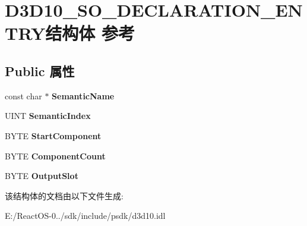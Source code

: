 \hypertarget{struct_d3_d10___s_o___d_e_c_l_a_r_a_t_i_o_n___e_n_t_r_y}{}\section{D3\+D10\+\_\+\+S\+O\+\_\+\+D\+E\+C\+L\+A\+R\+A\+T\+I\+O\+N\+\_\+\+E\+N\+T\+R\+Y结构体 参考}
\label{struct_d3_d10___s_o___d_e_c_l_a_r_a_t_i_o_n___e_n_t_r_y}
\subsection*{Public 属性}
\begin{DoxyCompactItemize}
\item 
\mbox{\label{struct_d3_d10___s_o___d_e_c_l_a_r_a_t_i_o_n___e_n_t_r_y_ad23d4ee16b552d085f5c798069dd0d74}} 
const char $\ast$ {\bfseries Semantic\+Name}
\item 
\mbox{\label{struct_d3_d10___s_o___d_e_c_l_a_r_a_t_i_o_n___e_n_t_r_y_aabfa29870f45b35b65f16c8d69329d0a}} 
U\+I\+NT {\bfseries Semantic\+Index}
\item 
\mbox{\label{struct_d3_d10___s_o___d_e_c_l_a_r_a_t_i_o_n___e_n_t_r_y_a520087c2053de192dc75787a0a1562de}} 
B\+Y\+TE {\bfseries Start\+Component}
\item 
\mbox{\label{struct_d3_d10___s_o___d_e_c_l_a_r_a_t_i_o_n___e_n_t_r_y_a162e456e3c09427bda13bd84d8fe12cc}} 
B\+Y\+TE {\bfseries Component\+Count}
\item 
\mbox{\label{struct_d3_d10___s_o___d_e_c_l_a_r_a_t_i_o_n___e_n_t_r_y_ad397537fb5b76236bcfe53e2f0375eb3}} 
B\+Y\+TE {\bfseries Output\+Slot}
\end{DoxyCompactItemize}


该结构体的文档由以下文件生成\+:\begin{DoxyCompactItemize}
\item 
E\+:/\+React\+O\+S-\/0../sdk/include/psdk/d3d10.\+idl\end{DoxyCompactItemize}
